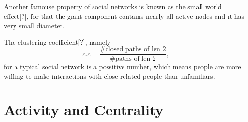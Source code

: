 \documentclass[12pt,abstract=true]{scrartcl}
\numberwithin{equation}{section}
\theoremstyle{definition}   \newtheorem{definition}{Definition}[section]
\theoremstyle{plain}        \newtheorem{theorem}{Theorem}[section]
\theoremstyle{plain}        \newtheorem{observation}{Observation}[section]
\theoremstyle{plain}        \newtheorem{fact}{Fact}[section]
\theoremstyle{plain}        \newtheorem{claim}{Claim}[section]
\theoremstyle{plain}        \newtheorem{lemma}[theorem]{Lemma}
\theoremstyle{plain}        \newtheorem{corollary}[theorem]{Corollary}
\theoremstyle{remark}       \newtheorem{example}{Example}[section]
\theoremstyle{remark}       \newtheorem{remark}{Remark}[section]
\begin{document}
Another famouse property of social networks is known as the small world
effect[?], for that the giant component contains nearly all active nodes and it
has very small diameter.

The clustering coefficient[?], namely
\begin{equation}
c.c=\frac{\#\text{closed paths of len 2}}{\#\text{paths of len 2}},
\end{equation}
for a typical social network is a possitive
number, which means people are more willing to make interactions with close
related people than unfamiliars. 

\section{Activity and Centrality}
\end{document}
